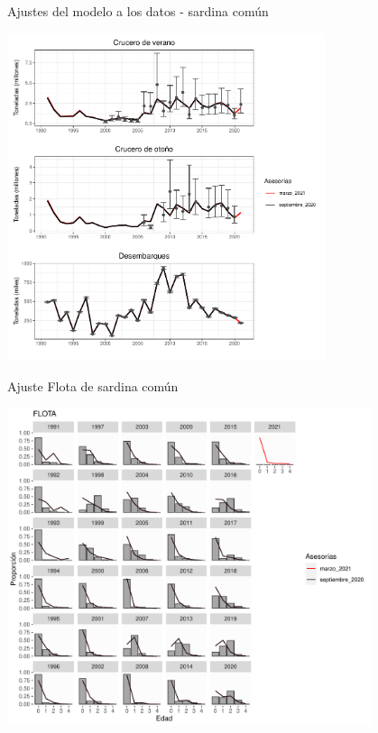 \documentclass[
  ignorenonframetext,
]{beamer}
\begin{document}
\begin{frame}{Ajustes del modelo a los datos - sardina común}
\protect\hypertarget{ajustes-del-modelo-a-los-datos---sardina-comuxfan}{}
\begin{center}
\includegraphics[width=0.7\textwidth]{FigurasInforme_Marzo/Fig26_Ajustes_indices-1.pdf}
\end{center}
\end{frame}

\begin{frame}{Ajuste Flota de sardina común}
\protect\hypertarget{ajuste-flota-de-sardina-comuxfan}{}
\begin{center}

\includegraphics[width=0.8\textwidth]{FigurasInforme_Marzo/Fig28_ajustesCompF-1.pdf}

\end{center}
\end{frame}
\end{document}
